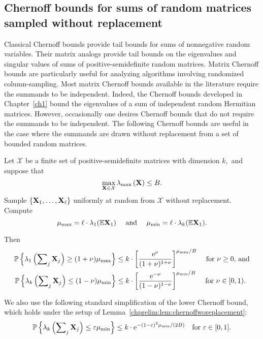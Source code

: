 \subsection[Chernoff bounds for sampling without replacement]{Chernoff bounds for sums of random matrices sampled without replacement}
 
 Classical Chernoff bounds provide tail bounds for sums of nonnegative random
 variables. Their matrix analogs provide tail bounds on the eigenvalues and singular
 values of sums of positive-semidefinite random matrices. Matrix Chernoff bounds are particularly useful for
 analyzing algorithms involving randomized column-sampling. Most matrix
 Chernoff bounds available in the literature require the summands to be independent.
 Indeed, the Chernoff bounds developed in Chapter~\ref{ch1} bound the eigenvalues
 of a sum of independent random Hermitian matrices. However, occasionally one desires
 Chernoff bounds that do not require the summands to be independent. The following Chernoff 
 bounds are useful in the case where the summands are drawn
 without replacement from a set of bounded random matrices. 

 \begin{lemma}
 \label{chprelim:lem:chernoffworeplacement}
 Let $\mathcal{X}$ be a finite set of positive-semidefinite matrices with 
 dimension $k,$ and suppose that
\[
 \max_{\mathbf{X} \in \mathcal{X}} \lambda_{\mathrm{max}}\left(\mathbf{X}\right) \leq B.
\]
Sample $\{\mathbf{X}_1, \ldots, \mathbf{X}_\ell \}$ uniformly at random from $\mathcal{X}$ 
without replacement. Compute
\[
 \mu_{\mathrm{max}} = \ell \cdot \lambda_1(\mathbb{E} \mathbf{X}_1) \quad \text{ and } 
 \quad  \mu_{\text{min}} = \ell \cdot \lambda_k(\mathbb{E} \mathbf{X}_1).
\]

Then
\begin{align*}
 \Prob{\lambda_1\left(\sum\nolimits_j \matX_j \right) \geq (1+\nu)\mu_{\mathrm{max}} } 
 &\leq k \cdot \bigg[ \frac{\expe^\nu}{(1+\nu)^{1+ \nu}} \bigg]^%
 {\mu_{\mathrm{max}}/B} \quad \text{ for $\nu \geq 0,$ and} \\
 \Prob{\lambda_k\left(\sum\nolimits_j \matX_j\right) \leq (1-\nu) \mu_{\mathrm{min}} }
 &\leq k \cdot \bigg[ \frac{\expe^{-\nu}}{(1-\nu)^{1-\nu}} \bigg]^%
 {\mu_{\mathrm{min}}/B} \quad \text{ for $\nu \in [0,1).$ }
\end{align*}

\end{lemma}

We also use the following standard simplification of the lower Chernoff bound,
which holds under the setup of Lemma~\ref{chprelim:lem:chernoffworeplacement}:
\begin{equation}
\label{chprelim:eqn:lowerchernoff}
 \mathbb{P}\left\{ \lambda_k\left(\sum\nolimits_j \mathbf{X}_j \right) \leq \varepsilon\mu_{\text{min}}
\right\} \leq k \cdot \mathrm{e}^{-(1-\varepsilon)^2 \mu_{\text{min}}/(2B)} \quad \text{for }
\varepsilon \in [0,1].
\end{equation}

